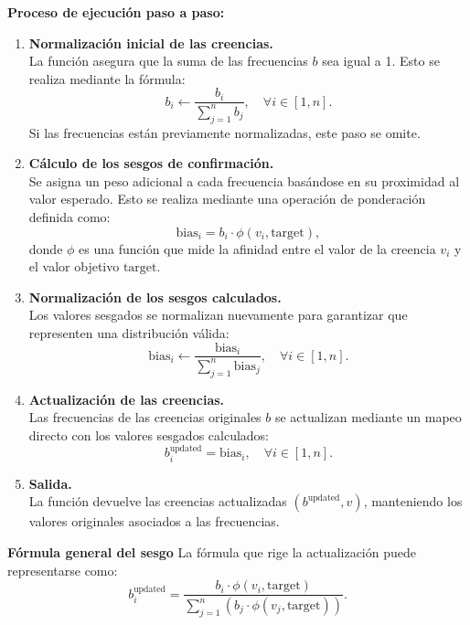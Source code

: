\documentclass{article}
\begin{document}
	\textbf{Proceso de ejecución paso a paso:}\\
	\begin{enumerate}
	    \item \textbf{Normalización inicial de las creencias.}\\
	    La función asegura que la suma de las frecuencias $b$ sea igual a 1. Esto se realiza mediante la fórmula:
	    \[
	    b_i \leftarrow \frac{b_i}{\sum_{j=1}^n b_j}, \quad \forall i \in [1, n].
	    \]
	    Si las frecuencias están previamente normalizadas, este paso se omite.
	
	    \item \textbf{Cálculo de los sesgos de confirmación.}\\
	    Se asigna un peso adicional a cada frecuencia basándose en su proximidad al valor esperado. Esto se realiza mediante una operación de ponderación definida como:
	    \[
	    \text{bias}_i = b_i \cdot \phi(v_i, \text{target}),
	    \]
	    donde $\phi$ es una función que mide la afinidad entre el valor de la creencia $v_i$ y el valor objetivo $\text{target}$. 
	
	    \item \textbf{Normalización de los sesgos calculados.}\\
	    Los valores sesgados se normalizan nuevamente para garantizar que representen una distribución válida:
	    \[
	    \text{bias}_i \leftarrow \frac{\text{bias}_i}{\sum_{j=1}^n \text{bias}_j}, \quad \forall i \in [1, n].
	    \]
	
	    \item \textbf{Actualización de las creencias.}\\
	    Las frecuencias de las creencias originales $b$ se actualizan mediante un mapeo directo con los valores sesgados calculados:
	    \[
	    b_i^{\text{updated}} = \text{bias}_i, \quad \forall i \in [1, n].
	    \]
	
	    \item \textbf{Salida.}\\
	    La función devuelve las creencias actualizadas $(b^{\text{updated}}, v)$, manteniendo los valores originales asociados a las frecuencias.
	\end{enumerate}
	
	\textbf{Fórmula general del sesgo}
	La fórmula que rige la actualización puede representarse como:
	\[
	b_i^{\text{updated}} = \frac{b_i \cdot \phi(v_i, \text{target})}{\sum_{j=1}^n \left(b_j \cdot \phi(v_j, \text{target})\right)}.
	\]
	
\end{document}
